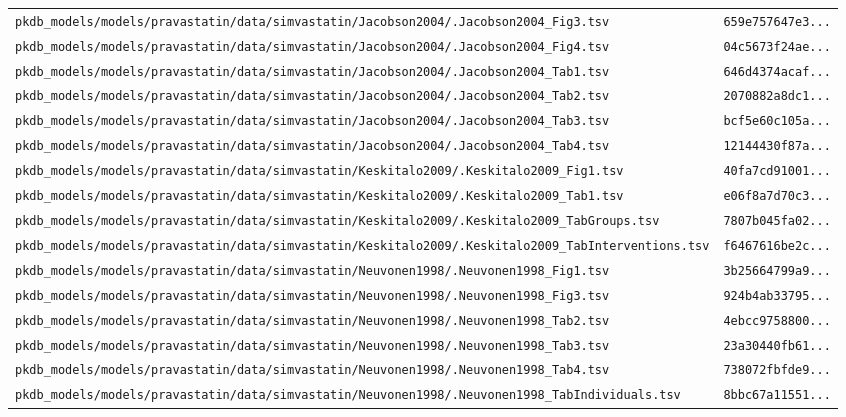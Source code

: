 \documentclass{article}
\begin{document}
\begin{longtable}{ll}
\texttt{pkdb\_models/models/pravastatin/data/simvastatin/Jacobson2004/.Jacobson2004\_Fig3.tsv} & \texttt{659e757647e3...} \\
\texttt{pkdb\_models/models/pravastatin/data/simvastatin/Jacobson2004/.Jacobson2004\_Fig4.tsv} & \texttt{04c5673f24ae...} \\
\texttt{pkdb\_models/models/pravastatin/data/simvastatin/Jacobson2004/.Jacobson2004\_Tab1.tsv} & \texttt{646d4374acaf...} \\
\texttt{pkdb\_models/models/pravastatin/data/simvastatin/Jacobson2004/.Jacobson2004\_Tab2.tsv} & \texttt{2070882a8dc1...} \\
\texttt{pkdb\_models/models/pravastatin/data/simvastatin/Jacobson2004/.Jacobson2004\_Tab3.tsv} & \texttt{bcf5e60c105a...} \\
\texttt{pkdb\_models/models/pravastatin/data/simvastatin/Jacobson2004/.Jacobson2004\_Tab4.tsv} & \texttt{12144430f87a...} \\
\texttt{pkdb\_models/models/pravastatin/data/simvastatin/Keskitalo2009/.Keskitalo2009\_Fig1.tsv} & \texttt{40fa7cd91001...} \\
\texttt{pkdb\_models/models/pravastatin/data/simvastatin/Keskitalo2009/.Keskitalo2009\_Tab1.tsv} & \texttt{e06f8a7d70c3...} \\
\texttt{pkdb\_models/models/pravastatin/data/simvastatin/Keskitalo2009/.Keskitalo2009\_TabGroups.tsv} & \texttt{7807b045fa02...} \\
\texttt{pkdb\_models/models/pravastatin/data/simvastatin/Keskitalo2009/.Keskitalo2009\_TabInterventions.tsv} & \texttt{f6467616be2c...} \\
\texttt{pkdb\_models/models/pravastatin/data/simvastatin/Neuvonen1998/.Neuvonen1998\_Fig1.tsv} & \texttt{3b25664799a9...} \\
\texttt{pkdb\_models/models/pravastatin/data/simvastatin/Neuvonen1998/.Neuvonen1998\_Fig3.tsv} & \texttt{924b4ab33795...} \\
\texttt{pkdb\_models/models/pravastatin/data/simvastatin/Neuvonen1998/.Neuvonen1998\_Tab2.tsv} & \texttt{4ebcc9758800...} \\
\texttt{pkdb\_models/models/pravastatin/data/simvastatin/Neuvonen1998/.Neuvonen1998\_Tab3.tsv} & \texttt{23a30440fb61...} \\
\texttt{pkdb\_models/models/pravastatin/data/simvastatin/Neuvonen1998/.Neuvonen1998\_Tab4.tsv} & \texttt{738072fbfde9...} \\
\texttt{pkdb\_models/models/pravastatin/data/simvastatin/Neuvonen1998/.Neuvonen1998\_TabIndividuals.tsv} & \texttt{8bbc67a11551...} \\

\end{longtable}
\end{document}
